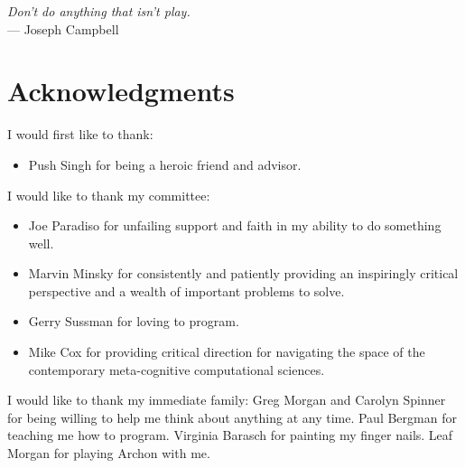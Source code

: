 



\begin{flushright}{\slshape    
Don't do anything that isn't play.} \\ \medskip
    --- Joseph Campbell
\end{flushright}



\bigskip

\begingroup
\let\clearpage\relax
\let\cleardoublepage\relax
\let\cleardoublepage\relax
\chapter*{Acknowledgments}

I would first like to thank:
\begin{itemize}
\item{Push Singh for being a heroic friend and advisor.}
\end{itemize}

\vspace{5mm}

I would like to thank my committee:
\begin{itemize}
\item{Joe Paradiso for unfailing support and faith in my ability to do
  something well.}
\item{Marvin Minsky for consistently and patiently providing an
  inspiringly critical perspective and a wealth of important problems
  to solve.}
\item{Gerry Sussman for loving to program.}
\item{Mike Cox for providing critical direction for navigating the
  space of the contemporary meta-cognitive computational sciences.}
\end{itemize}

\vspace{5mm}

\noindent I would like to thank my immediate family:
Greg Morgan and Carolyn Spinner for being willing to help me think about anything at any time.
Paul Bergman for teaching me how to program.
Virginia Barasch for painting my finger nails.
Leaf Morgan for playing Archon with me.

